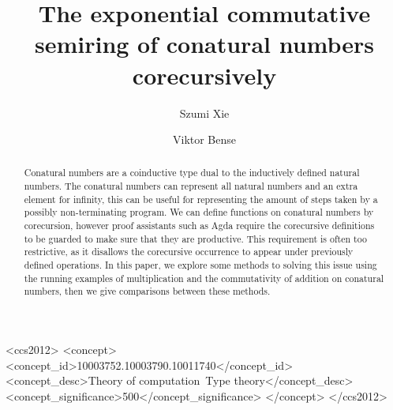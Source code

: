 \documentclass[sigplan, screen, natbib=false, review]{acmart}
\begin{document}
\title{The exponential commutative semiring of conatural numbers corecursively}

\author{Szumi Xie}

\author{Viktor Bense}


\begin{abstract}
  Conatural numbers are a coinductive type dual to the inductively defined
  natural numbers. The conatural numbers can represent all natural numbers and
  an extra element for infinity, this can be useful for representing the amount
  of steps taken by a possibly non-terminating program. We can define functions
  on conatural numbers by corecursion, however proof assistants such as Agda
  require the corecursive definitions to be guarded to make sure that they are
  productive. This requirement is often too restrictive, as it disallows the
  corecursive occurrence to appear under previously defined operations. In this
  paper, we explore some methods to solving this issue using the running
  examples of multiplication and the commutativity of addition on conatural
  numbers, then we give comparisons between these methods.
\end{abstract}

\begin{CCSXML}
  <ccs2012>
  <concept>
  <concept_id>10003752.10003790.10011740</concept_id>
  <concept_desc>Theory of computation~Type theory</concept_desc>
  <concept_significance>500</concept_significance>
  </concept>
  </ccs2012>
\end{CCSXML}
\end{document}
